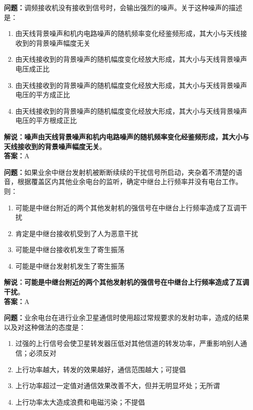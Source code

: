 \textbf{问题：}调频接收机没有接收到信号时，会输出强烈的噪声。关于这种噪声的描述是：

\begin{enumerate}[label=\Alph*), leftmargin=1cm]
	\item 由天线背景噪声和机内电路噪声的随机频率变化经鉴频形成，其大小与天线接收到的背景噪声幅度无关
	\item 由天线接收到的背景噪声的随机幅度变化经放大形成，其大小与天线背景噪声电压成正比
	\item 由天线接收到的背景噪声的随机幅度变化经放大形成，其大小与天线背景噪声电压的平方成正比
	\item 由天线接收到的背景噪声的随机幅度变化经放大形成，其大小与天线背景噪声电压的平方根成正比
\end{enumerate}

\textbf{解说：噪声由天线背景噪声和机内电路噪声的随机频率变化经鉴频形成，其大小与天线接收到的背景噪声幅度无关}。\\\textbf{答案：}A%


\textbf{问题：}如果业余中继台发射机被断断续续的干扰信号所启动，夹杂着不清楚的语音，根据覆盖区内其他业余电台的监听，确定中继台上行频率并没有电台工作。则：

\begin{enumerate}[label=\Alph*), leftmargin=1cm]
	\item 可能是中继台附近的两个其他发射机的强信号在中继台上行频率造成了互调干扰
	\item 肯定是中继台接收机受到了人为恶意干扰
	\item 可能是中继台接收机发生了寄生振荡
	\item 可能是中继台发射机发生了寄生振荡
\end{enumerate}

\textbf{解说：可能是中继台附近的两个其他发射机的强信号在中继台上行频率造成了互调干扰}。\\\textbf{答案：}A%


\textbf{问题：}业余电台在进行业余卫星通信时使用超过常规要求的发射功率，造成的结果以及对这种做法的态度是：

\begin{enumerate}[label=\Alph*), leftmargin=1cm]
	\item 过强的上行信号会使卫星转发器压低对其他信道的转发功率，严重影响别人通信；必须反对
	\item 上行功率越大，转发的效果越好，通信范围越大；可提倡
	\item 上行功率超过一定值对通信效果改善不大，但并无明显坏处；无所谓
	\item 上行功率太大造成浪费和电磁污染；不提倡
\end{enumerate}

